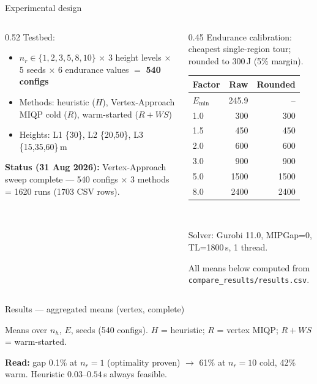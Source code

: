 \documentclass[aspectratio=169,10pt]{beamer}
\begin{document}
\begin{frame}{Experimental design}
  \begin{columns}[T,onlytextwidth]
    \begin{column}{0.52\textwidth}
      {\small Testbed:}
      \begin{itemize}
        \item $n_r\in\{1,2,3,5,8,10\}$ $\times$ 3 height levels $\times$ 5 seeds $\times$ 6 endurance values $=$ \textbf{540 configs}
        \item Methods: heuristic ($H$), Vertex-Approach MIQP cold ($R$), warm-started ($R{+}WS$)
        \item Heights: L1 \{30\}, L2 \{20,50\}, L3 \{15,35,60\}\,m
      \end{itemize}
      {\scriptsize \textbf{Status (31 Aug 2026):} Vertex-Approach sweep complete — 540 configs $\times$ 3 methods = 1620 runs (1703 CSV rows).}
    \end{column}
    \begin{column}{0.45\textwidth}
      {\small Endurance calibration:}
      {\scriptsize cheapest single-region tour; rounded to 300\,J (5\% margin).}
      {\tiny
      \begin{tabular}{lrr}
        \toprule Factor & Raw & Rounded\\\midrule
        $E_{\min}$ & 245.9 & --\\
        1.0 & 300 & 300\\ 1.5 & 450 & 450\\ 2.0 & 600 & 600\\
        3.0 & 900 & 900\\ 5.0 & 1500 & 1500\\ 8.0 & 2400 & 2400\\\bottomrule
      \end{tabular}}
      \\[0.05cm]
      {\scriptsize Solver: Gurobi 11.0, MIPGap=0, TL=1800\,s, 1 thread. \par}
      {\scriptsize All means below computed from \texttt{compare\_results/results.csv}.}
    \end{column}
  \end{columns}
\end{frame}

\begin{frame}{Results — aggregated means (vertex, complete)}
  \centering
  {\scriptsize }
  {\tiny Means over $n_h$, $E$, seeds (540 configs). $H$ = heuristic; $R$ = vertex MIQP; $R{+}WS$ = warm-started. \par}
  \vspace{0.1cm}
  {\scriptsize \textbf{Read:} gap 0.1\% at $n_r=1$ (optimality proven) $\to$ 61\% at $n_r=10$ cold, 42\% warm. Heuristic $0.03$--$0.54$\,s always feasible.}
\end{frame}
\end{document}
